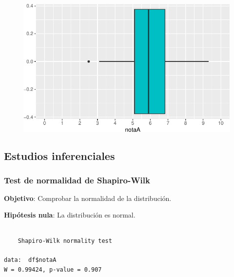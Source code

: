 \documentclass[
  a4paper,
]{scrreport}
\newenvironment{Shaded}{\begin{snugshade}}{\end{snugshade}}
\newcommand{\FunctionTok}[1]{\textcolor[rgb]{0.28,0.35,0.67}{#1}}
\newcommand{\NormalTok}[1]{\textcolor[rgb]{0.00,0.23,0.31}{#1}}
\newcommand{\SpecialCharTok}[1]{\textcolor[rgb]{0.37,0.37,0.37}{#1}}
\theoremstyle{definition}
\theoremstyle{definition}
\theoremstyle{remark}
\begin{document}
\begin{figure}[H]

{\centering \includegraphics{./08-analisis-estadisticos_files/figure-pdf/unnamed-chunk-15-1.pdf}

}

\end{figure}

\hypertarget{estudios-inferenciales}{%
\subsection{Estudios inferenciales}\label{estudios-inferenciales}}

\hypertarget{test-de-normalidad-de-shapiro-wilk}{%
\subsubsection{Test de normalidad de
Shapiro-Wilk}\label{test-de-normalidad-de-shapiro-wilk}}

\textbf{Objetivo}: Comprobar la normalidad de la distribución.

\textbf{Hipótesis nula}: La distribución es normal.

\begin{Shaded}
\end{Shaded}

\begin{verbatim}

    Shapiro-Wilk normality test

data:  df$notaA
W = 0.99424, p-value = 0.907
\end{verbatim}
\end{document}
